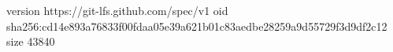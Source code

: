 version https://git-lfs.github.com/spec/v1
oid sha256:cd14e893a76833f00fdaa05e39a621b01c83aedbe28259a9d55729f3d9df2c12
size 43840
